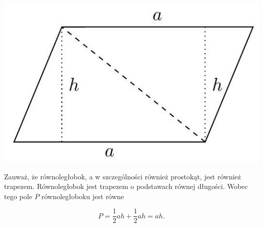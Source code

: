 \documentclass[10pt]{article}
\begin{document}
\begin{center}
\includegraphics[max width=\textwidth]{2024_11_21_8f01584889ff06348ae7g-200(2)}
\end{center}

Zauważ, że równoległobok, a w szczególności również prostokąt, jest również trapezem. Równoległobok jest trapezem o podstawach równej długości. Wobec tego pole \(P\) równoległoboku jest równe

\[
P=\frac{1}{2} a h+\frac{1}{2} a h=a h .
\]
\end{document}
